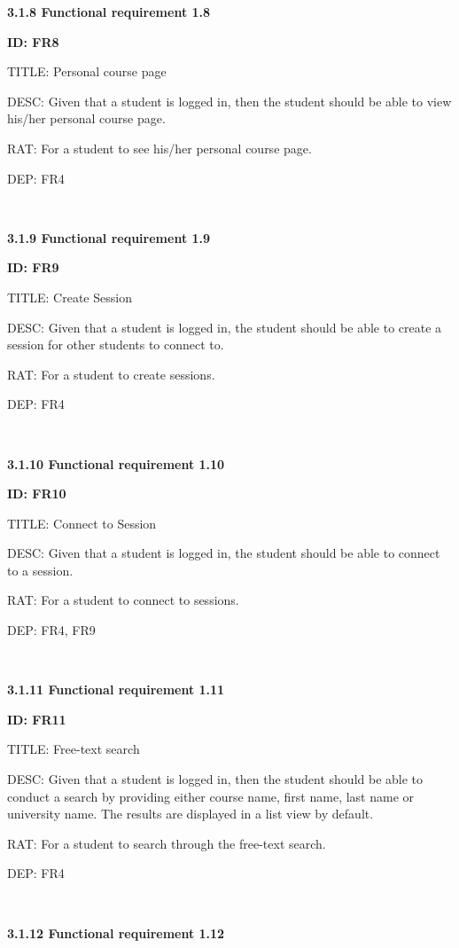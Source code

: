 \documentclass[12pt,a4paper]{article}
\begin{document}
\begin{flushleft}
        \textbf{3.1.8 Functional requirement 1.8}

        \textbf{ID: FR8}

        TITLE: Personal course page

        DESC: Given that a student is logged in, then the student should be able
        to view his/her personal course page.

        RAT: For a student to see his/her personal course page.

        DEP: FR4

        \

        \textbf{3.1.9 Functional requirement 1.9}

        \textbf{ID: FR9}

        TITLE: Create Session

        DESC: Given that a student is logged in, the student should be able to create a session for other students to connect to.

        RAT: For a student to create sessions.

        DEP: FR4

        \

        \textbf{3.1.10 Functional requirement 1.10}

        \textbf{ID: FR10}

        TITLE: Connect to Session

        DESC: Given that a student is logged in, the student should be able to connect to a session.

        RAT: For a student to connect to sessions.

        DEP: FR4, FR9

        \

        \textbf{3.1.11 Functional requirement 1.11}

        \textbf{ID: FR11}

        TITLE: Free-text search

        DESC: Given that a student is logged in, then the student should be able
        to conduct a search by providing either course name, first name, last
        name or university name. The results are displayed in a list view by
        default.

        RAT: For a student to search through the free-text search.

        DEP: FR4

        \

        \textbf{3.1.12 Functional requirement 1.12}


\end{flushleft}
\end{document}
